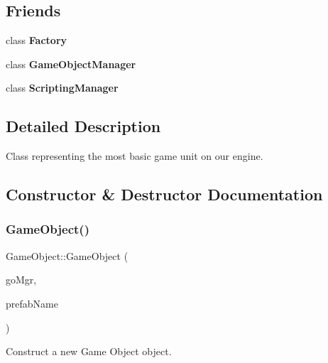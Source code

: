 \subsection*{Friends}
\begin{DoxyCompactItemize}
\item 
\mbox{\label{classGameObject_a328c093d609680cca505905c6d49901a}} 
class {\bfseries Factory}
\item 
\mbox{\label{classGameObject_a1792bd89cabd9de04209188147625921}} 
class {\bfseries Game\+Object\+Manager}
\item 
\mbox{\label{classGameObject_ab3d6fafb2064bace492fd6b503d044f4}} 
class {\bfseries Scripting\+Manager}
\end{DoxyCompactItemize}


\subsection{Detailed Description}
Class representing the most basic game unit on our engine. 

\subsection{Constructor \& Destructor Documentation}
\mbox{\label{classGameObject_aada17b22194b4188379d8d7d56f87bc2}} 
\subsubsection{\texorpdfstring{Game\+Object()}{GameObject()}\hspace{0.1cm}{\footnotesize\ttfamily [1/2]}}
{\footnotesize\ttfamily Game\+Object\+::\+Game\+Object (\begin{DoxyParamCaption}\item[{\hyperlink{classGameObjectManager}{Game\+Object\+Manager} $\ast$}]{go\+Mgr,  }\item[{std\+::string}]{prefab\+Name }\end{DoxyParamCaption})}



Construct a new Game Object object. 


